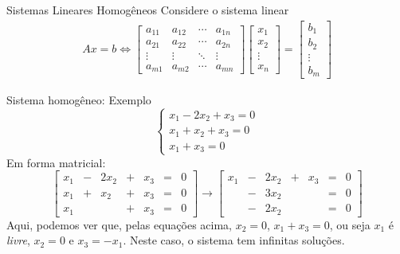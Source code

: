 \documentclass{beamer}
\begin{document}
\begin{darkframes}
\begin{frame}{Sistemas Lineares Homogêneos}
Considere o sistema linear
\begin{align*}
    Ax=b \Leftrightarrow 
        \begin{bmatrix}
            a_{11} & a_{12} & \cdots & a_{1n}\\
            a_{21} & a_{22} & \cdots & a_{2n}\\
            \vdots & \vdots & \ddots & \vdots\\
            a_{m1} & a_{m2} & \cdots & a_{mn}
        \end{bmatrix}
        \begin{bmatrix}
            x_1\\
            x_2\\
            \vdots\\
            x_n
        \end{bmatrix}
        =
        \begin{bmatrix}
            b_1\\
            b_2\\
            \vdots\\
            b_m
        \end{bmatrix}
\end{align*}
\vfill
{}
\end{frame}

\begin{frame}{Sistema homogêneo: Exemplo}
	\begin{equation*}
		\begin{cases}
			x_1 - 2x_2  + x_3 =0\\
			x_1+x_2+x_3=0\\
			x_1  +x_3 = 0
		\end{cases}
	\end{equation*}
	Em forma matricial:
	\begin{equation*}
		\begin{bmatrix}
			x_1 & -& 2x_2 & +&x_3&=&0\\
			x_1&+&x_2&+&x_3&=&0\\
			x_1& & &+&x_3 &=& 0
		\end{bmatrix} \rightarrow 
		\begin{bmatrix}
			x_1 & -& 2x_2 & +&x_3&=&0\\
			 &-&3x_2&&&=&0\\
			&-&2x_2 & & &=& 0
		\end{bmatrix}
	\end{equation*}
	Aqui, podemos ver que, pelas equações acima, $x_2 = 0$, $x_1+x_3 = 0$, ou seja $x_1$ é \emph{livre}, $x_2 = 0$ e $x_3 = -x_1$. Neste caso, o sistema tem infinitas soluções. 
\end{frame}


\end{darkframes}
\end{document}
